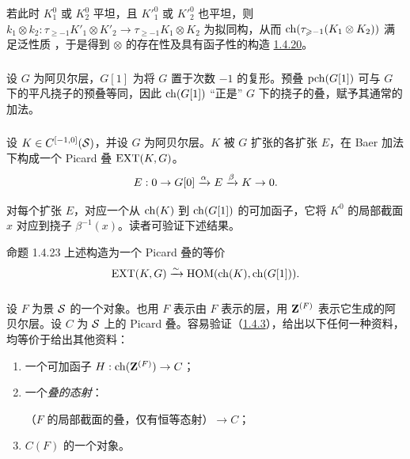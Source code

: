 若\pageoriginale 此时 $K^0_{1}$ 或 $K^0_{2}$ 平坦，且 ${K'}^0_{1}$ 或 ${K'}^0_{2}$ 也平坦，则 $k_{1}\otimes k_{2}:\tau_{\geq -1}{K'}_{1}\otimes {K'}_{2}\rightarrow
\tau_{\geq -1}K_{1}\otimes K_{2}$ 为拟同构，从而 $\operatorname{ch}(\tau_{\geqslant -1}(K_{1}\otimes K_{2}))$ 满足泛性质 ，于是得到 $\otimes$ 的存在性及具有函子性的构造 \hyperref[XVIII.const1.4.20]{1.4.20}。

\setcounter{subsubsection}{20} \subsubsection{} 设 $G$ 为阿贝尔层，$G[1]$ 为将 $G$ 置于次数 $-1$ 的复形。预叠 $\operatorname{pch}(G[1])$ 可与 $G$ 下的平凡挠子的预叠等同，因此 $\operatorname{ch}(G[1])$ “正是” $G$ 下的挠子的叠，赋予其通常的加法。

\subsubsection{} 设 $K\in C^{[-1,0]}({\mathcal S})$，并设 $G$ 为阿贝尔层。$K$ 被 $G$ 扩张的各扩张 $E$，在
Baer 加法下构成一个 Picard 叠 $\operatorname{EXT}(K,G)$。 $$
E:0\rightarrow
G[0]\xrightarrow{\alpha}E\xrightarrow{\beta}K\rightarrow 0{}.
$$

对每个扩张 $E$，对应一个从 $\operatorname{ch}(K)$ 到 $\operatorname{ch}(G[1])$ 的可加函子，它将 $K^{0}$ 的局部截面 $x$ 对应到挠子 $\beta^{-1}(x)$。读者可验证下述结果。

\begin{enonce*}{命题 1.4.23} 上述构造为一个 Picard 叠的等价 $$
\operatorname{EXT}(K,G)\xrightarrow{\sim} \operatorname{HOM}(\operatorname{ch}(K),\operatorname{ch}(G[1])){}.
$$ \end{enonce*}

\setcounter{subsubsection}{23} \subsubsection{} 设 $F$ 为景 ${\mathcal S}$ 的一个对象。也用 $F$ 表示由 $F$ 表示的层，用 $\mathbf{Z}^{(F)}$ 表示它生成的阿贝尔层。设 $C$ 为 ${\mathcal S}$ 上的 Picard 叠。容易验证（\cf \hyperref[XVIII.lem1.4.3]{1.4.3}），给出以下任何一种资料，均等价于给出其他资料： \begin{enumerate} \renewcommand{\theenumi}{\alph{enumi}} \renewcommand{\labelenumi}{\theenumi)} \item 一个可加函子 $H:\operatorname{ch}(\mathbf{Z}^{(F)})\rightarrow C$；

\item 一个\emph{叠的态射}：

（$F$ 的局部截面的叠，仅有恒等态射）$\rightarrow C$；

\item $C(F)$ 的一个对象。 \end{enumerate}

